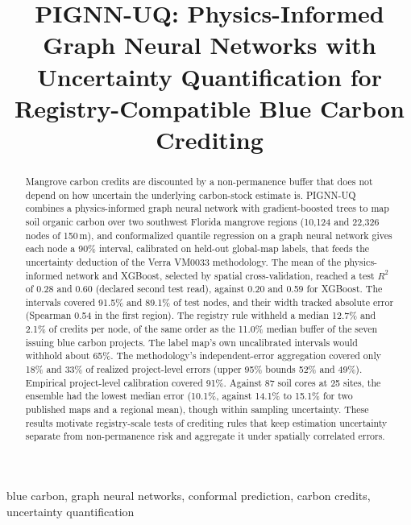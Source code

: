 \documentclass[conference]{IEEEtran}
\begin{document}
\title{PIGNN-UQ: Physics-Informed Graph Neural Networks with Uncertainty Quantification for Registry-Compatible Blue Carbon Crediting}

\author{
}

\maketitle

\begin{abstract}
Mangrove carbon credits are discounted by a non-permanence buffer that does not depend on how uncertain the underlying carbon-stock estimate is.
PIGNN-UQ combines a physics-informed graph neural network with gradient-boosted trees to map soil organic carbon over two southwest Florida mangrove regions (10,124 and 22,326 nodes of 150\,m), and conformalized quantile regression on a graph neural network gives each node a 90\% interval, calibrated on held-out global-map labels, that feeds the uncertainty deduction of the Verra VM0033 methodology.
The mean of the physics-informed network and XGBoost, selected by spatial cross-validation, reached a test $R^2$ of 0.28 and 0.60 (declared second test read), against 0.20 and 0.59 for XGBoost.
The intervals covered 91.5\% and 89.1\% of test nodes, and their width tracked absolute error (Spearman 0.54 in the first region).
The registry rule withheld a median 12.7\% and 2.1\% of credits per node, of the same order as the 11.0\% median buffer of the seven issuing blue carbon projects.
The label map's own uncalibrated intervals would withhold about 65\%.
The methodology's independent-error aggregation covered only 18\% and 33\% of realized project-level errors (upper 95\% bounds 52\% and 49\%).
Empirical project-level calibration covered 91\%.
Against 87 soil cores at 25 sites, the ensemble had the lowest median error (10.1\%, against 14.1\% to 15.1\% for two published maps and a regional mean), though within sampling uncertainty.
These results motivate registry-scale tests of crediting rules that keep estimation uncertainty separate from non-permanence risk and aggregate it under spatially correlated errors.
\end{abstract}

\begin{IEEEkeywords}
blue carbon, graph neural networks, conformal prediction, carbon credits, uncertainty quantification
\end{IEEEkeywords}
\end{document}
